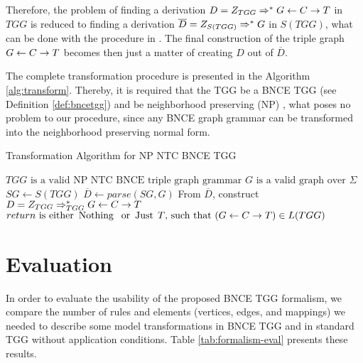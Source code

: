 \documentclass[runningheads]{llncs}
\begin{document}
Therefore, the problem of finding a derivation $D = Z_{TGG} \Rightarrow^*_{} G \overset{}{\leftarrow} C \overset{}{\rightarrow} T$ in $TGG$ is reduced to finding a derivation $\overline{D} = Z_{S(TGG)} \Rightarrow^*_{} G$ in $S(TGG)$, what can be done with the procedure in \cite{rozenberg1986boundary}. The final construction of the triple graph $G \overset{}{\leftarrow} C \overset{}{\rightarrow} T$ becomes then just a matter of creating $D$ out of $\overline{D}$.

The complete transformation procedure is presented in the Algorithm \ref{alg:transform}. Thereby, it is required that the TGG be a BNCE TGG (see Definition \ref{def:bncetgg}) and be neighborhood preserving (NP) \cite{rozenberg1986boundary,skodinis1998neighborhood}, what poses no problem to our procedure, since any BNCE graph grammar can be transformed into the neighborhood preserving normal form. 
\begin{algorithm}[h]
	\caption{Transformation Algorithm for NP NTC BNCE TGG}
	\begin{algorithmic}[h]
		\Require $TGG \text{ is a valid NP NTC BNCE triple graph grammar}$
		\Require $G \text{ is a valid graph over } \Sigma$
		\State $SG \gets S(TGG)$ 
		\State $\overline{D} \gets parse(SG,G)$ 
		 
		\State From $\overline{D}$, construct $D = Z_{TGG} \Rightarrow^*_{TGG} G \overset{}{\leftarrow} C \overset{}{\rightarrow} T$  
		\State {}
		\Else
		\State \Return {$\Nothing$} 
		\EndIf
		\EndFunction 
		\Ensure $return \text{ is either } \operatorname{\text{Nothing}}\; \text{ or } \operatorname{\text{Just}}\; T \text{, such that } (G \overset{}{\leftarrow} C \overset{}{\rightarrow} T) \in L(TGG)$
	\end{algorithmic}
	\label{alg:transform}
\end{algorithm}

\section{Evaluation}
\label{sec:eval}
In order to evaluate the usability of the proposed BNCE TGG formalism, we compare the number of rules and elements (vertices, edges, and mappings) we needed to describe some model transformations in BNCE TGG and in standard TGG without application conditions. Table \ref{tab:formalism-eval} presents these results.
\end{document}
